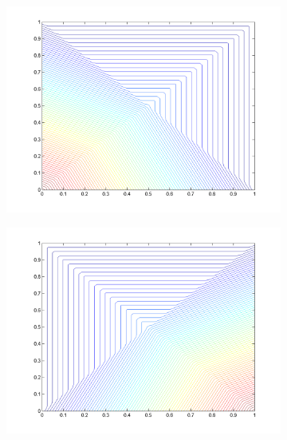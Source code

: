 \begin{figure}
\label{fig::2D_PWL_unit_square_basis_functions}
\centering
	\begin{subfigure}[b]{0.48\textwidth}
		\centering
		\includegraphics[width=\textwidth]{figures/sec_BF/PWL_square_contour_1.png}
		\caption{}
	\end{subfigure}
	\hfill
	\begin{subfigure}[b]{0.48\textwidth}
		\centering
		\includegraphics[width=\textwidth]{figures/sec_BF/PWL_square_contour_2.png}
		\caption{}
	\end{subfigure}
	\vfill
	\begin{subfigure}[b]{0.48\textwidth}

\end{subfigure}
\end{figure}
